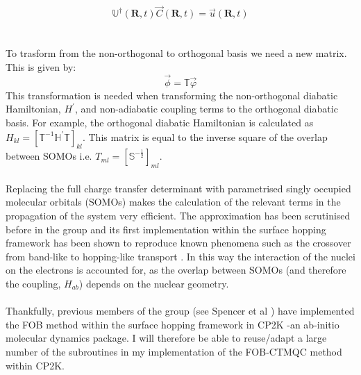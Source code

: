 \begin{equation}
  \mathbb{U}^{\dagger}(\textbf{R}, t) \vec{C}(\textbf{R}, t) = \vec{u}(\textbf{R}, t)
  \label{eq:diab_to_adiab}
\end{equation}
\\\\
To trasform from the non-orthogonal to orthogonal basis we need a new matrix. This is given by:
\begin{equation}
  \vec{\phi} = \mathbb{T} \vec{\varphi}
  \label{eq:orth_to_nonorth}
\end{equation}
This transformation is needed when transforming the non-orthogonal diabatic Hamiltonian, $H^{'}$, and non-adiabatic coupling terms to the orthogonal diabatic basis. For example, the orthogonal diabatic Hamiltonian is calculated as $H_{kl} = \left[\mathbb{T}^{-1} \mathbb{H}^{'} \mathbb{T} \right]_{kl}$. This matrix is equal to the inverse square of the overlap between SOMOs i.e. $T_{ml} = [\mathbb{S}^{-\frac{1}{2}}]_{ml}$.
\\\\
Replacing the full charge transfer determinant with parametrised singly occupied molecular orbitals (SOMOs) makes the calculation of the relevant terms in the propagation of the system very efficient. The approximation has been scrutinised before in the group
\cite{giannini_crossover_2018, carof_detailed_2017, gajdos_ultrafast_2014, Gajdos2013Mar, spencer_confronting_2016, spencer_fob-sh:_2016} and its first implementation within the surface hopping framework has been shown to reproduce known phenomena such as the crossover from band-like to hopping-like transport \cite{giannini_crossover_2018}. In this way the interaction of the nuclei on the electrons is accounted for, as the overlap between SOMOs (and therefore the coupling, $H_{ab}$) depends on the nuclear geometry.
\\\\
Thankfully, previous members of the group (see Spencer et al \cite{spencer_fob-sh:_2016}) have implemented the FOB method within the surface hopping framework in CP2K -an ab-initio molecular dynamics package. I will therefore be able to reuse/adapt a large number of the subroutines in my implementation of the FOB-CTMQC method within CP2K.   
